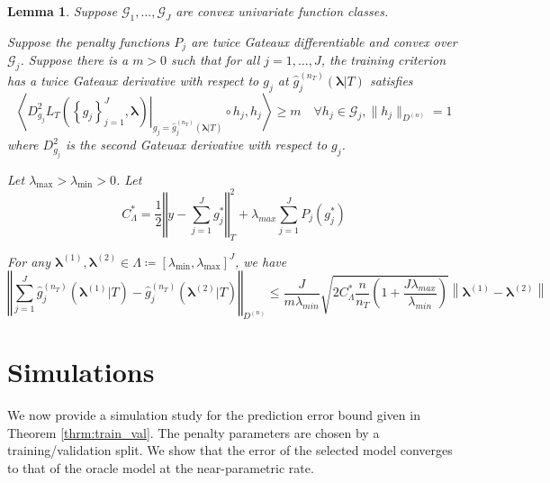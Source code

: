 \documentclass[12pt]{article}
\newtheorem{lemma}{Lemma}
\begin{document}
\begin{lemma}
\label{lemma:nonparam_smooth}
Suppose $\mathcal{G}_1, ..., \mathcal{G}_J$ are convex univariate function classes.

Suppose the penalty functions $P_{j}$ are twice Gateaux differentiable and convex over $\mathcal{G}_j$. Suppose there is a $m > 0$ such that for all $j=1,...,J$, the training criterion has a twice Gateaux derivative with respect to $g_j$ at $\hat{g}^{(n_T)}_j( \boldsymbol{\lambda} | T)$ satisfies
\begin{equation}
\left \langle 
\left . D^2_{g_j} L_T \left ( \left \{ g_j \right \}_{j=1}^J, \boldsymbol{\lambda} \right ) \right |_{g_j= \hat{g}^{(n_T)}_j( \boldsymbol{\lambda} | T) }
\circ h_j, h_j
\right \rangle 
\ge m
\quad \forall h_j \in \mathcal{G}_j,  \|h_j \|_{D^{(n)}} = 1
\label{eq:gateuax}
\end{equation}
where $D^2_{g_j}$ is the second Gateuax derivative with respect to $g_j$.

Let $\lambda_{\max} > \lambda_{\min} > 0 $. Let
\begin{equation}
C_{\Lambda}^*=
\frac{1}{2}\left\Vert y- \sum_{j=1}^J g^*_j\right\Vert _{T}^{2}
+\lambda_{max}\sum_{j=1}^{J} P_{j}(g^*_j)
\end{equation}

For any $\boldsymbol{\lambda}^{(1)}, \boldsymbol{\lambda}^{(2)} \in \Lambda \coloneqq \left [ \lambda_{\min}, \lambda_{\max} \right ]^J$, we have
\begin{equation}
\label{eq:nonparam_lipshitz_thrm}
\left\Vert 
\sum_{j=1}^J \hat{g}_j^{(n_T)}\left(\boldsymbol{\lambda}^{(1)} |T \right)-\hat{g}_j^{(n_T)}\left(\boldsymbol{\lambda}^{(2)} |T \right)\right\Vert _{D^{(n)}}
\le
\frac{J}{m \lambda_{min}}\sqrt{2 C_{\Lambda}^* \frac{n}{n_{T}}\left(1+\frac{J\lambda_{max}}{\lambda_{min}}\right)}
\left \|\boldsymbol{\lambda}^{(1)}-\boldsymbol{\lambda}^{(2)} \right \|
\end{equation}
\end{lemma}


\section{Simulations}\label{sec:simulations}

We now provide a simulation study for the prediction error bound given in Theorem \ref{thrm:train_val}. The penalty parameters are chosen by a training/validation split. We show that the error of the selected model converges to that of the oracle model at the near-parametric rate.
\end{document}
